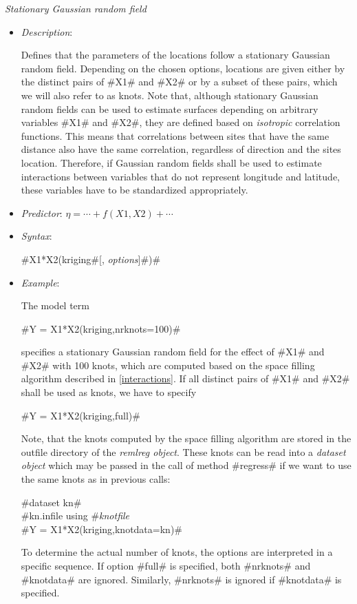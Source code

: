{\em Stationary Gaussian random field}
\begin{itemize}
\item[] {\em Description}:

Defines that the parameters of the locations follow a stationary
Gaussian random field. Depending on the chosen options, locations
are given either by the distinct pairs of #X1# and #X2# or by a
subset of these pairs, which we will also refer to as knots. Note
that, although stationary Gaussian random fields can be used to
estimate surfaces depending on arbitrary variables #X1# and #X2#,
they are defined based on {\em isotropic} correlation functions.
This means that correlations between sites that have the same
distance also have the same correlation, regardless of direction
and the sites location. Therefore, if Gaussian random fields shall
be used to estimate interactions between variables that do not
represent longitude and latitude, these variables have to be
standardized appropriately.

\item[] {\em Predictor}: $\eta= \cdots + f(X1,X2) + \cdots$
\item[] {\em Syntax}:

#X1*X2(kriging#[, {\em options}]#)# \item[] {\em Example}:

The model term

#Y = X1*X2(kriging,nrknots=100)#

specifies a stationary Gaussian random field for the effect of
#X1# and #X2# with 100 knots, which are computed based on the
space filling algorithm described in \autoref{interactions}. If
all distinct pairs of #X1# and #X2# shall be used as knots, we
have to specify

#Y = X1*X2(kriging,full)#

Note, that the knots computed by the space filling algorithm are
stored in the outfile directory of the {\em remlreg object}. These
knots can be read into a {\em dataset object} which may be passed
in the call of method #regress# if we want to use the same knots
as in previous calls:

 #dataset kn#\\
 #kn.infile using #{\em knotfile}\\
 #Y = X1*X2(kriging,knotdata=kn)#

To determine the actual number of knots, the options are
interpreted in a specific sequence. If option #full# is specified,
both #nrknots# and #knotdata# are ignored. Similarly, #nrknots# is
ignored if #knotdata# is specified.

\end{itemize}

